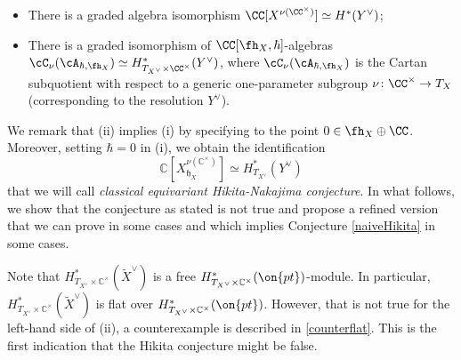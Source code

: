 \documentclass[12pt]{amsart}
\begin{document}
  \begin{conj}\label{naiveHikita}
        \begin{itemize}
            \item[(i)] There is a graded algebra isomorphism $\CC[X^{\nu(\CC^\times)}]\simeq H^*(Y^\vee)$;
            \item[(ii)] There is a graded isomorphism of $\CC[\fh_X, \hbar]$-algebras $\cC_\nu(\cA_{\hbar, \fh_X})\simeq H^*_{T_{X^\vee}\times \CC^\times}(Y^\vee)$, where $\cC_\nu(\cA_{\hbar, \fh_X})$ is the Cartan subquotient with respect to a generic one-parameter subgroup $\nu\colon \CC^\times \to T_{X}$ (corresponding to the resolution $Y^\vee$).
        \end{itemize}
    \end{conj}
    We remark that (ii) implies (i) by specifying to the point $0\in \fh_X\oplus \CC$. Moreover, setting $\hbar=0$ in (i), we obtain the identification 
    \begin{equation}\label{classical_equiv_hikita}
    \mathbb{C}[X_{\mathfrak{h}_X}^{\nu(\mathbb{C}^\times)}] \simeq H^*_{T_{X^\vee}}(Y^\vee)
    \end{equation}
    that we will call {\emph{classical equivariant Hikita-Nakajima conjecture}}.
    In what follows, we show that the conjecture as stated is not true and propose a refined version that we can prove in some cases and which implies Conjecture \ref{naiveHikita} in some cases. 
    \begin{rmk}
        Note that $H^*_{T_{X^\vee} \times \mathbb{C}^\times}(\widetilde{X}^\vee)$ is a free $H^*_{T_{X^\vee} \times \mathbb{C}^\times}(\on{pt})$-module. In particular, $H^*_{T_{X^\vee} \times \mathbb{C}^\times}(\widetilde{X}^\vee)$ is flat over $H^*_{T_{X^\vee} \times \mathbb{C}^\times}(\on{pt})$. However, that is not true for the left-hand side of (ii), a counterexample is described in \cref{counterflat}. This is the first indication that the Hikita conjecture might be false. 
    \end{rmk}
\end{document}
